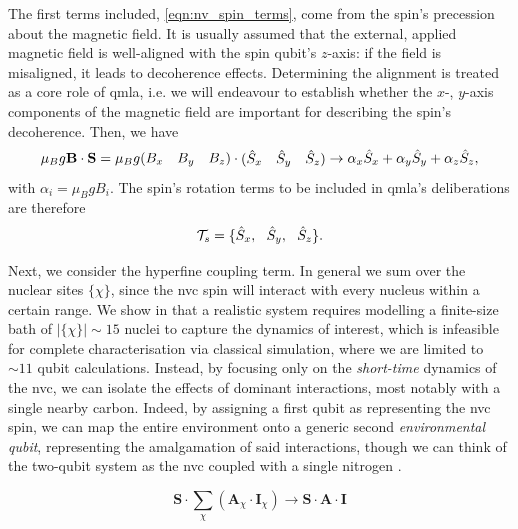 The first terms included, \cref{eqn:nv_spin_terms}, come from the spin's precession about the magnetic field. 
It is usually assumed that the external, applied magnetic field is well-aligned with the spin qubit's $z$-axis:
    if the field is misaligned, it leads to decoherence effects. 
Determining the alignment is treated as a core role of \gls{qmla}, 
    i.e. we will endeavour to establish whether the $x$-, $y$-axis components of the magnetic field 
    are important for describing the spin's decoherence. 
Then, we have
\begin{equation}
    \label{eqn:spin_tensor_terms}
    \mu_B g \mathbf{B} \cdot \mathbf{S} 
    = \mu_B g \begin{matrix}(B_x & B_y & B_z)\end{matrix} \cdot \begin{matrix}(\hat{S}_x & \hat{S}_y & \hat{S}_z)\end{matrix}
    \rightarrow \alpha_x \hat{S}_x + \alpha_y \hat{S}_y + \alpha_z \hat{S}_z,
\end{equation}
with $\alpha_i = \mu_B g B_i$. 
The spin's rotation terms to be included in \gls{qmla}'s deliberations are therefore 
\begin{equation}
    \label{eqn:exp_spin_terms}
    \termset_{s} = \{ \hat{S}_x, \  \ \hat{S}_y, \ \ \hat{S}_z\}.
\end{equation}
\par 

Next, we consider the hyperfine coupling term. 
In general we sum over the nuclear sites $\{ \chi \}$, 
    since  the \gls{nvc} spin will interact with every nucleus within a certain range.
We show in \cite{gentile2020learning} that a realistic system requires modelling a 
    finite-size bath of $|\{\chi\}|\sim 15$ 
    nuclei to capture the dynamics of interest, 
    which is infeasible for complete characterisation via classical simulation, 
    where we are limited to $\sim 11$ qubit calculations\footnotemark. 
Instead, by focusing only on the \emph{short-time} dynamics of the \gls{nvc}, 
    we can isolate the effects of dominant interactions, 
    most notably with a single nearby \gls{carbon}. 
Indeed, by assigning a first qubit as representing the \gls{nvc} spin, 
    we can map the entire environment onto a generic second \emph{environmental qubit}, 
    representing the amalgamation of said interactions, 
    though we can think of the two-qubit system as the \gls{nvc} coupled with a single \gls{nitrogen} \cite{smeltzer201113c}. 

\begin{equation}
    \mathbf{S} \cdot \sum_{\chi} \left( \mathbf{A}_{\chi} \cdot \mathbf{I}_{\chi} \right)
    \rightarrow 
    \mathbf{S} \cdot \mathbf{A} \cdot \mathbf{I} 
\end{equation}

